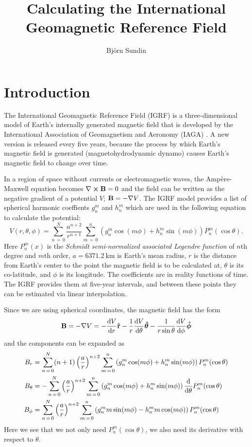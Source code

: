 \documentclass[12pt]{article}
\title{\vspace{-2.5em}Calculating the International Geomagnetic Reference Field}
\author{Björn Sundin}
\begin{document}
\maketitle

\section{Introduction}
The International Geomagnetic Reference Field (IGRF) is a three-dimensional model of Earth's internally generated magnetic field that is developed by the International Association of Geomagnetism and Aeronomy (IAGA) \parencite{Alken2021}. A new version is released every five years, because the process by which Earth's magnetic field is generated (magnetohydrodynamic dynamo) causes Earth's magnetic field to change over time.

In a region of space without currents or electromagnetic waves, the Ampère-Maxwell equation becomes $\nabla\crossproduct\vect{B} = 0$ and the field can be written as the negative gradient of a potential $V$; $\boldsymbol{\mathbf{B}} = -\nabla V$. The IGRF model provides a list of spherical harmonic coeffients $g_n^m$ and $h_n^m$ which are used in the following equation to calculate the potential:
\begin{equation}
  V(r, \theta, \phi) = \sum_{n\,=\,0}^N\frac{a^{n+2}}{r^{n+1}}\sum_{m\,=\,0}^n\left(g_n^m\cos(m\phi) + h_n^m\sin(m\phi)\right)P_n^m(\cos\theta).
\end{equation}
Here $P_n^m(x)$ is the \textit{Schmidt semi-normalized associated Legendre function} of $n$th degree and $m$th order, $a = \SI{6371.2}{\km}$ is Earth's mean radius, $r$ is the distance from Earth's center to the point the magnetic field is to be calculated at, $\theta$ is its co-latitude, and $\phi$ is its longitude. The coefficients are in reality functions of time. The IGRF provides them at five-year intervals, and between these points they can be estimated via linear interpolation. 

Since we are using spherical coordinates, the magnetic field has the form 
\begin{equation}
  \vect{B} = -\nabla V = -\derivative{V}{r}\uvect{r} -\frac{1}{r}\derivative{V}{\theta}\uvect{\theta} - \frac{1}{r\sin\theta}\derivative{V}{\phi}\uvect{\phi}
\end{equation}
and the components can be expanded as
\begin{align}
  B_r &= \sum_{n\,=\,0}^N(n+1)\left(\frac{a}{r}\right)^{n+2}\sum_{m\,=\,0}^n\left(g_n^m\cos(m\phi) + h_n^m\sin(m\phi)\right)P_n^m(\cos\theta)\\ 
  B_\theta &= -\sum_{n\,=\,0}^N\left(\frac{a}{r}\right)^{n+2}\sum_{m\,=\,0}^n\left(g_n^m\cos(m\phi) + h_n^m\sin(m\phi)\right)\derivative{\theta}P_n^m(\cos\theta)\\ 
  B_\phi &= \sum_{n\,=\,0}^N\left(\frac{a}{r}\right)^{n+2}\sum_{m\,=\,0}^n\left(g_n^mm\sin(m\phi) - h_n^mm\cos(m\phi)\right)P_n^m(\cos\theta)
\end{align}
Here we see that we not only need $P_n^m(\cos\theta)$, we also need its derivative with respect to $\theta$.
\end{document}
